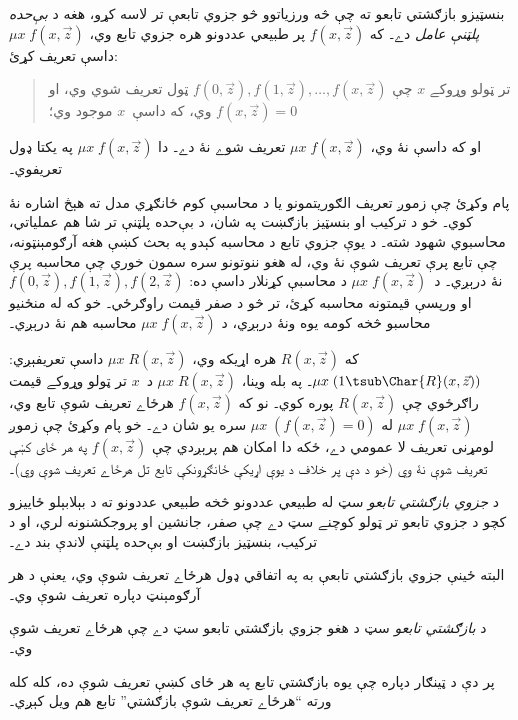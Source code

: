 \documentclass[../../../include/open-logic-section]{subfiles}
\begin{document}
بنسټيزو بازګشتي تابعو ته چې څه ورزياتوو څو جزوي تابعې تر لاسه کړو،
هغه د \emph{بې‌حده پلټنې عامل} دے۔ که $f(x,\vec z)$ پر طبيعي عددونو
هره جزوي تابع وي، $\mu x \; f(x,\vec z)$ داسې تعريف کړئ:
\begin{quote}
  تر ټولو وړوکے $x$ چې $f(0,\vec z), f(1,\vec z), \dots, f(x,\vec
  z)$ ټول تعريف شوي وي، او $f(x,\vec z) = 0$ وي، که داسې~$x$ موجود وي؛
\end{quote}
او که داسې نۀ وي، $\mu x \; f(x,\vec z)$ تعريف شوے نۀ دے۔ دا
$\mu x \; f(x,\vec z)$ په يکتا ډول تعريفوي۔

\begin{explain}
پام وکړئ چې زموږ تعريف  الګوريتمونو
يا د محاسبې کوم ځانګړي مدل ته هېڅ اشاره نۀ کوي۔ خو د ترکيب او بنسټيز
بازګښت په شان، د بې‌حده پلټنې تر شا هم عملياتي، محاسبوي شهود شته۔ د
يوې جزوي تابع د محاسبه کېدو په بحث کښې هغه آرګومېنټونه، چې تابع پرې
تعريف شوې نۀ وي، له هغو ننوتونو سره سمون خوري چې محاسبه پرې نۀ درېږي۔
د~$\mu x \; f(x,\vec z)$ د محاسبې کړنلار داسې ده:
$f(0,\vec z), f(1,\vec z), f(2,\vec z)$ او ورپسې قيمتونه محاسبه کړئ، تر څو د
صفر قيمت راوګرځي۔ خو که له منځنيو محاسبو څخه کومه يوه ونۀ درېږي، د
$\mu x \; f(x,\vec z)$ محاسبه هم نۀ درېږي۔
\end{explain}

که $R(x,\vec z)$ هره اړيکه وي، $\mu x \; R(x,\vec z)$ داسې تعريفېږي:
$\mu x \; (1 \tsub \Char{R}(x,\vec z))$۔ په بله وينا، $\mu x \;
R(x,\vec z)$ د~$x$ تر ټولو وړوکے قيمت راګرځوي چې $R(x,\vec z)$ پوره
کوي۔ نو که $f(x,\vec z)$ هرځاے تعريف شوې تابع وي، $\mu x \;
f(x,\vec z)$ له $\mu x \; (f(x,\vec z) = 0)$ سره يو شان دے۔ خو پام
وکړئ چې زموږ لومړنی تعريف لا عمومي دے، ځکه دا امکان هم پرېږدي چې
$f(x,\vec z)$ په هر ځای کښې تعريف شوې نۀ وي (خو د دې پر خلاف د يوې
اړيکې ځانګړونکې تابع تل هرځاے تعريف شوې وي)۔

\begin{defn}
د \emph{جزوي بازګشتي تابعو} سټ له طبيعي عددونو څخه طبيعي عددونو ته د
بېلابېلو ځاييزو کچو د جزوي تابعو تر ټولو کوچنے سټ دے چې صفر، جانشين او
پروجکشنونه لري، او د ترکيب، بنسټيز بازګښت او بې‌حده پلټنې لاندې بند دے۔
\end{defn}

البته ځينې جزوي بازګشتي تابعې به په اتفاقي ډول هرځاے تعريف شوې وي،
يعنې د هر آرګومېنټ دپاره تعريف شوې وي۔

\begin{defn}
د \emph{بازګشتي تابعو} سټ د هغو جزوي بازګشتي تابعو سټ دے چې هرځاے
تعريف شوې وي۔
\end{defn}

پر دې د ټينګار دپاره چې يوه بازګشتي تابع په هر ځای کښې تعريف شوې ده،
کله کله ورته ``هرځاے تعريف شوې بازګشتي'' تابع هم ويل کېږي۔
\end{document}
